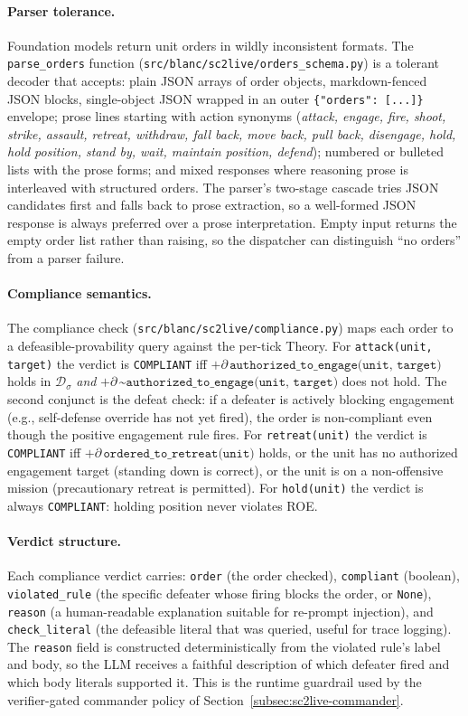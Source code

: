 \documentclass{article}
\theoremstyle{definition}
\newcommand{\D}{\mathcal{D}}
\begin{document}
\paragraph{Parser tolerance.} Foundation models return unit orders in wildly inconsistent formats. The \texttt{parse\_orders} function (\texttt{src/blanc/sc2live/orders\_schema.py}) is a tolerant decoder that accepts: plain JSON arrays of order objects, markdown-fenced JSON blocks, single-object JSON wrapped in an outer \texttt{\{"orders": [...]\}} envelope; prose lines starting with action synonyms (\emph{attack, engage, fire, shoot, strike, assault, retreat, withdraw, fall back, move back, pull back, disengage, hold, hold position, stand by, wait, maintain position, defend}); numbered or bulleted lists with the prose forms; and mixed responses where reasoning prose is interleaved with structured orders. The parser's two-stage cascade tries JSON candidates first and falls back to prose extraction, so a well-formed JSON response is always preferred over a prose interpretation. Empty input returns the empty order list rather than raising, so the dispatcher can distinguish ``no orders'' from a parser failure.

\paragraph{Compliance semantics.} The compliance check (\texttt{src/blanc/sc2live/compliance.py}) maps each order to a defeasible-provability query against the per-tick Theory. For \texttt{attack(unit, target)} the verdict is \texttt{COMPLIANT} iff $+\partial\,\texttt{authorized\_to\_engage(unit, target)}$ holds in $\D_\sigma$ \emph{and} $+\partial\,\texttt{\textasciitilde authorized\_to\_engage(unit, target)}$ does not hold. The second conjunct is the defeat check: if a defeater is actively blocking engagement (e.g., self-defense override has not yet fired), the order is non-compliant even though the positive engagement rule fires. For \texttt{retreat(unit)} the verdict is \texttt{COMPLIANT} iff $+\partial\,\texttt{ordered\_to\_retreat(unit)}$ holds, or the unit has no authorized engagement target (standing down is correct), or the unit is on a non-offensive mission (precautionary retreat is permitted). For \texttt{hold(unit)} the verdict is always \texttt{COMPLIANT}: holding position never violates ROE.

\paragraph{Verdict structure.} Each compliance verdict carries: \texttt{order} (the order checked), \texttt{compliant} (boolean), \texttt{violated\_rule} (the specific defeater whose firing blocks the order, or \texttt{None}), \texttt{reason} (a human-readable explanation suitable for re-prompt injection), and \texttt{check\_literal} (the defeasible literal that was queried, useful for trace logging). The \texttt{reason} field is constructed deterministically from the violated rule's label and body, so the LLM receives a faithful description of which defeater fired and which body literals supported it. This is the runtime guardrail used by the verifier-gated commander policy of Section~\ref{subsec:sc2live-commander}.
\end{document}
